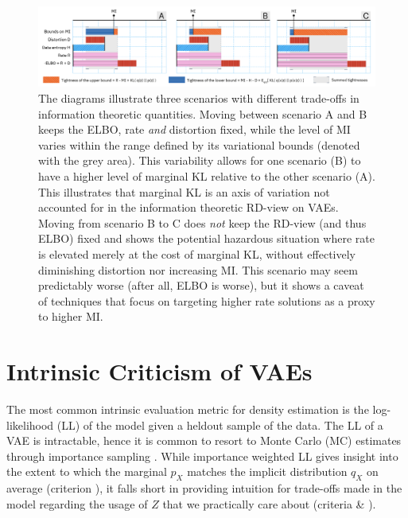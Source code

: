 
\begin{figure}[t]
    \centering
    \includegraphics[width=\textwidth]{images/marginal-kl-diagram.png}
    \caption{The diagrams illustrate three scenarios with different trade-offs in information theoretic quantities. Moving between scenario A and B keeps the ELBO, rate \textit{and} distortion fixed, while the level of MI varies within the range defined by its variational bounds (denoted with the grey area). This variability allows for one scenario (B) to have a higher level of marginal KL relative to the other scenario (A). This illustrates that marginal KL is an axis of variation not accounted for in the information theoretic RD-view on VAEs. Moving from scenario B to C does \textit{not} keep the RD-view (and thus ELBO) fixed and shows the potential hazardous situation where rate is elevated merely at the cost of marginal KL, without effectively diminishing distortion nor increasing MI. This scenario may seem predictably worse (after all, ELBO is worse), but it shows a caveat of techniques that focus on targeting higher rate solutions as a proxy to higher MI.}
    \label{fig:marginal-kl-diagram}
\end{figure}

\section{Intrinsic Criticism of VAEs}\label{sec:intrinsic}


The most common intrinsic evaluation metric for density estimation is the log-likelihood (LL) of the model given a heldout sample of the data. The LL of a VAE is intractable, hence it is common to resort to Monte Carlo (MC) estimates through importance sampling \citep[IS;][]{robert2004monte}. 
While importance weighted LL \citep[IW LL;][]{burda2015importance} gives insight into the extent to which the marginal $p_X$ matches the implicit distribution $q_X$ on average  (criterion \enumone), it falls short in providing intuition for trade-offs made in the model regarding the usage of $Z$ that we practically care about (criteria \enumtwo \& \enumthree).

